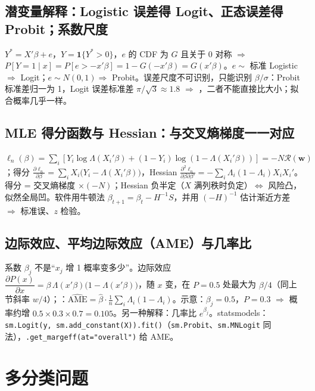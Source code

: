 \subsection{潜变量解释：Logistic 误差得 Logit、正态误差得 Probit；系数尺度}
$Y^*=X'\beta+e$，$Y=\mathbf 1\{Y^*>0\}$，$e$ 的 CDF 为 $G$ 且关于 0 对称 $\Rightarrow$ $P[Y=1\mid x]=P[e>-x'\beta]=1-G(-x'\beta)=G(x'\beta)$。$e\sim$ 标准 Logistic $\Rightarrow$ Logit；$e\sim N(0,1)\Rightarrow$ Probit。误差尺度不可识别，只能识别 $\beta/\sigma$：Probit 标准差归一为 1，Logit 误差标准差 $\pi/\sqrt3\approx1.8$ $\Rightarrow$ ，二者不能直接比大小；拟合概率几乎一样。

\subsection{MLE 得分函数与 Hessian：与交叉熵梯度一一对应}
$\ell_n(\beta)=\sum_i[Y_i\log\Lambda(X_i'\beta)+(1-Y_i)\log(1-\Lambda(X_i'\beta))]=-N\mathcal R(\bm w)$；得分 $\frac{\partial\ell_n}{\partial\beta}=\sum_iX_i\big(Y_i-\Lambda(X_i'\beta)\big)$，Hessian $\frac{\partial^2\ell_n}{\partial\beta\partial\beta'}=-\sum_i\Lambda_i(1-\Lambda_i)X_iX_i'$。得分 = 交叉熵梯度 $\times(-N)$；Hessian 负半定（$X$ 满列秩时负定）$\iff$ 风险凸，似然全局凹。软件用牛顿法 $\beta_{t+1}=\beta_t-H^{-1}S$，并用 $(-H)^{-1}$ 估计渐近方差 $\Rightarrow$ 标准误、$z$ 检验。

\subsection{边际效应、平均边际效应（AME）与几率比}
系数 $\beta_j$ 不是“$x_j$ 增 1 概率变多少”。边际效应 $\dfrac{\partial P(x)}{\partial x}=\beta\,\Lambda(x'\beta)\big(1-\Lambda(x'\beta)\big)$，随 $x$ 变，在 $P=0.5$ 处最大为 $\beta/4$（同上节斜率 $w/4$）；：$\widehat{\text{AME}}=\hat\beta\cdot\frac1n\sum_i\Lambda_i(1-\Lambda_i)$。示意：$\beta_j=0.5$，$P=0.3$ $\Rightarrow$ 概率约增 $0.5\times0.3\times0.7=0.105$。另一种解释：几率比 $e^{\beta_j}$。statsmodels：\texttt{sm.Logit(y, sm.add\_constant(X)).fit()}（\texttt{sm.Probit}、\texttt{sm.MNLogit} 同法），\texttt{.get\_margeff(at="overall")} 给 AME。

\section{多分类问题}\label{sec:D02a-multi}


